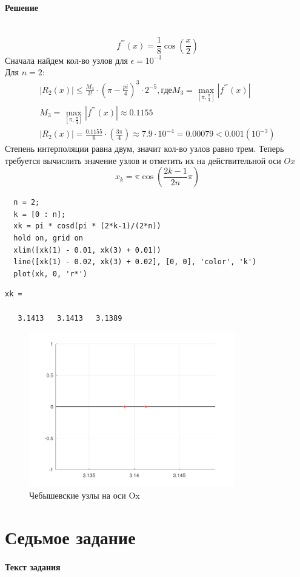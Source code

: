 \paragraph{Решение} ~\\
\[
  f^{'''}(x) = \frac{1}{8}\cos(\frac{x}{2})
\]
Сначала найдем кол-во узлов для $\epsilon = 10^{-3}$\\[2mm]
Для $n = 2$:
\begin{gather*}
  |R_{2}(x)| \leq \frac{M_{3}}{3!}\cdot\left(\pi - \frac{pi}{4}\right)^{3}\cdot2^{-5}, \text{где} M_{3} = \max_{\left[\pi, \frac{\pi}{4}\right]}|f^{'''}(x)|\\
  M_{3} = \max_{\left[\pi, \frac{\pi}{4}\right]}|f^{'''}(x)| \approx 0.1155 \\
  |R_{2}(x)| = \frac{0.1155}{6} \cdot \left(\frac{3\pi}{4} \right) \approx 7.9 \cdot 10^{-4} = 0.00079 < 0.001 (10^{-3})
\end{gather*}
Степень интерполяции равна двум, значит кол-во узлов равно трем. Теперь требуется вычислить значение узлов и отметить их на действительной оси $Ox$
\[
  x_{k} = \pi \cos(\frac{2k-1}{2n}\pi)
\]
\begin{lstlisting}
  n = 2;
  k = [0 : n];
  xk = pi * cosd(pi * (2*k-1)/(2*n))
  hold on, grid on
  xlim([xk(1) - 0.01, xk(3) + 0.01])
  line([xk(1) - 0.02, xk(3) + 0.02], [0, 0], 'color', 'k')
  plot(xk, 0, 'r*')
\end{lstlisting}
\begin{lstlisting}[backgroundcolor=\color{cyan}]
  xk =

   3.1413   3.1413   3.1389
\end{lstlisting}
\begin{figure}[h]
  \caption{Чебышевские узлы на оси Ox}
  \label{fig:plot_6}
  \centering
  \includegraphics[width=0.8\textwidth]{images/task_6_1.png}
\end{figure}

\section{Седьмое задание}
\paragraph{Текст задания}
